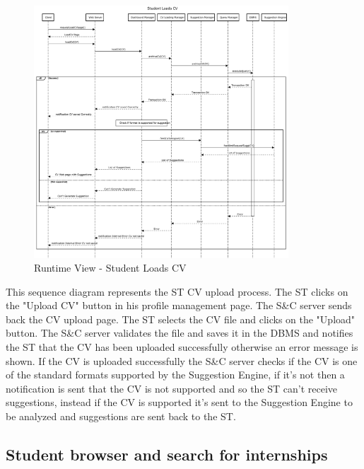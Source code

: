 \begin{figure}[H]
      \centering
      \includegraphics[width=0.85\textwidth]{Images/RV_02.pdf}
      \caption{Runtime View - Student Loads CV}
      \label{fig:rv-student-loads-cv}
\end{figure}

\par This sequence diagram represents the ST CV upload process. The ST clicks on the "Upload CV" button in his profile 
management page. The S\&C server sends back the CV upload page. The ST selects the CV file and clicks on the "Upload" button.
The S\&C server validates the file and saves it in the DBMS and notifies the ST that the CV has been uploaded successfully
otherwise an error message is shown. If the CV is uploaded successfully the S\&C server checks if the CV is one of the 
standard formats supported by the Suggestion Engine, if it's not then a notification is sent that the CV is not supported and
so the ST can't receive suggestions, instead if the CV is supported it's sent to the Suggestion Engine to be analyzed and
suggestions are sent back to the ST.

\subsection{Student browser and search for internships}
\label{sub:student-browser-and-search-for-internships}%

